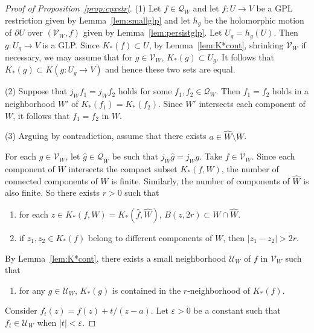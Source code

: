 \documentclass{amsart}
\numberwithin{equation}{section}
\newtheorem{proposition}[theorem]{Proposition}%
\newcommand{\C}{\mathbb C}
\theoremstyle{definition}
\theoremstyle{remark}
\begin{document}
\begin{proof} [Proof of Proposition~\ref{prop:cpxstr}]
(1) Let $f\in \mathcal{Q}_W$ and let $f:U\to V$ be a GPL restriction given by Lemma~\ref{lem:smallglp} and let $h_g$ be the holomorphic motion of $\partial U$ over $(\mathcal{V}_W, f)$ given by Lemma~\ref{lem:persistglp}. Let $U_g=h_g(U)$. Then $g: U_g\to V$ is a GLP. Since $K_*(f)\subset U$, by Lemma~\ref{lem:K*cont}, shrinking $\mathcal{V}_W$ if necessary, we may assume that for $g\in \mathcal{V}_W$, $K_*(g)\subset U_g$. It follows that $K_*(g)\subset K(g:U_g\to V)$ and hence these two sets are equal. 
%

(2) Suppose that $j_Wf_1=j_Wf_2$ holds for some $f_1, f_2\in \mathcal{Q}_W$. Then $f_1=f_2$ holds in a neighborhood $W'$ of $K_*(f_1)=K_*(f_2)$. Since $W'$ intersects each component of $W$, it follows that $f_1=f_2$ in $W$. 
 
(3) Arguing by contradiction, assume that 
there exists $a\in  \widehat{W}\setminus \overline{W}$.
 
For each $g\in \mathcal{V}_W$, let $\widehat{g}\in \mathcal{Q}_{\widehat{W}}$ be such that $j_{\widehat{W}}\widehat{g}=j_W g$. 
Take $f\in \mathcal{V}_W$. Since each component of $W$ intersects the compact subset $K_*(f,W)$, the number of connected components of $W$ is finite. Similarly, the number of components of $\widehat{W}$ is also finite. So there exists $r>0$ such that 
\begin{enumerate}
  \item[(i)] for each $z\in K_*(f,W)=K_*(\widehat{f},\widehat{W})$, $B(z, 2r)\subset W\cap \widehat{W}$.
  \item[(ii)] if $z_1, z_2\in K_*(f)$ belong to different components of $W$, then $|z_1-z_2|>2r$. 
\end{enumerate}
By Lemma~\ref{lem:K*cont}, there exists a small neighborhood $\mathcal{U}_W$ of $f$ in $\mathcal{V}_W$ such that 
\begin{enumerate}
\item [(iii)] for any $g\in  \mathcal{U}_W$, 
$K_*(g)$ is contained in the $r$-neighborhood of $K_*(f).$
\end{enumerate}
Consider $f_t(z)=f(z)+t/(z-a)$. Let $\varepsilon>0$ be a constant such that $f_t\in \mathcal{U}_W$ when $|t|<\varepsilon$. 


\end{proof}
\end{document}
